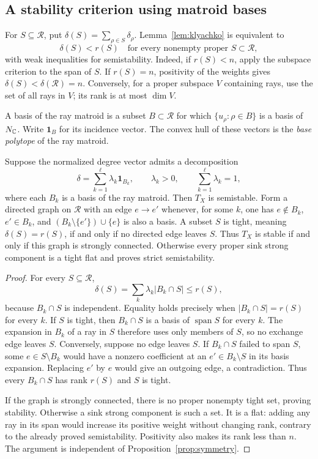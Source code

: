 \subsection{A stability criterion using matroid bases}

For $S\subseteq\mathcal R$, put $\delta(S)=\sum_{\rho\in S}\delta_\rho$.
Lemma~\ref{lem:klyachko} is equivalent to
\begin{equation}\label{eq:subsetstability}
 \delta(S)<r(S)\quad
 \text{for every nonempty proper }S\subset\mathcal R,
\end{equation}
with weak inequalities for semistability. Indeed, if $r(S)<n$, apply
the subspace criterion to the span of $S$. If $r(S)=n$, positivity of
the weights gives $\delta(S)<\delta(\mathcal R)=n$. Conversely, for a
proper subspace $V$ containing rays, use the set of all rays in $V$;
its rank is at most $\dim V$.

A basis of the ray matroid is a subset $B\subset\mathcal R$ for which
$\{u_\rho:\rho\in B\}$ is a basis of $N_{\mathbb{C}}$. Write $\mathbf1_B$ for
its incidence vector. The convex hull of these vectors is the
\emph{base polytope} of the ray matroid.

\begin{lemma}\label{lem:basecertificate}
Suppose the normalized degree vector admits a decomposition
\[
 \delta=\sum_{k=1}^{\ell}\lambda_k\mathbf1_{B_k},
 \qquad \lambda_k>0,\qquad\sum_{k=1}^{\ell}\lambda_k=1,
\]
where each $B_k$ is a basis of the ray matroid. Then $T_X$ is
semistable. Form a directed graph on $\mathcal R$ with an edge
$e\longrightarrow e'$ whenever, for some $k$, one has
$e\notin B_k$, $e'\in B_k$, and $(B_k\setminus\{e'\})\cup\{e\}$ is
also a basis. A subset $S$ is tight, meaning $\delta(S)=r(S)$,
if and only if no directed edge leaves $S$. Thus $T_X$ is stable
if and only if this graph is strongly connected. Otherwise every
proper sink strong component is a tight flat and proves strict
semistability.
\end{lemma}

\begin{proof}
For every $S\subseteq\mathcal R$,
\[
 \delta(S)=\sum_k\lambda_k|B_k\cap S|\le r(S),
\]
because $B_k\cap S$ is independent. Equality holds precisely when
$|B_k\cap S|=r(S)$ for every $k$.
If $S$ is tight, then $B_k\cap S$ is a basis of $\operatorname{span}S$
for every $k$. The expansion in $B_k$ of a ray in $S$ therefore uses
only members of $S$, so no exchange edge leaves $S$.
Conversely, suppose no edge leaves $S$. If $B_k\cap S$ failed to
span $S$, some $e\in S\setminus B_k$ would have a nonzero coefficient
at an $e'\in B_k\setminus S$ in its basis expansion. Replacing $e'$
by $e$ would give an outgoing edge, a contradiction. Thus every
$B_k\cap S$ has rank $r(S)$ and $S$ is tight.

If the graph is strongly connected, there is no proper nonempty tight
set, proving stability. Otherwise a sink strong component is such a
set. It is a flat: adding any ray in its span would increase its
positive weight without changing rank, contrary to the already proved
semistability. Positivity also makes its rank less than $n$.
The argument is independent of Proposition~\ref{prop:symmetry}.
\end{proof}

